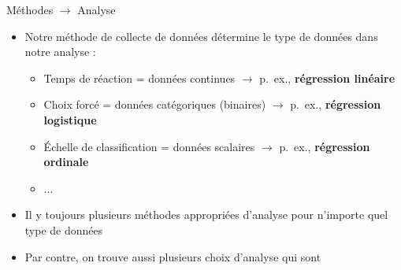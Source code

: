 \documentclass[xcolor=dvipsnames, mathserif, 10pt, aspectratio=169, handout]{beamer}
\begin{document}
\begin{frame}{Méthodes $\rightarrow$ Analyse}{}

\begin{itemize}
	\item Notre méthode de collecte de données détermine le type de données dans notre analyse :

\pause

	\begin{itemize}
		\item Temps de réaction = données continues $\rightarrow$ p.\ ex., \textbf{régression linéaire}
\pause

		\item Choix forcé = données catégoriques (binaires) $\rightarrow$ p.\ ex., \textbf{régression logistique}
\pause

		\item Échelle de classification = données scalaires $\rightarrow$ p.\ ex., \textbf{régression ordinale}
		\item ...
	\end{itemize}
	\item Il y toujours plusieurs méthodes appropriées d'analyse pour n'importe quel type de données
	\item[\winner] Par contre, on trouve aussi plusieurs choix d'analyse qui sont 

\end{itemize}

	
\end{frame}
\end{document}
